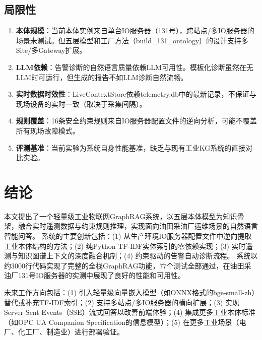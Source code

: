 \documentclass[12pt,a4paper]{article}
\begin{document}
\subsection{局限性}

\begin{enumerate}
  \item \textbf{本体规模}：当前本体实例来自单台IO服务器（131号），跨站点/多IO服务器的场景未测试。但五层模型和工厂方法（build\_131\_ontology）的设计支持多Site/多Gateway扩展。
  \item \textbf{LLM依赖}：告警诊断的自然语言质量依赖LLM可用性。模板化诊断虽然在无LLM时可运行，但生成的报告不如LLM诊断自然流畅。
  \item \textbf{实时数据时效性}：LiveContextStore依赖telemetry.db中的最新记录，不保证与现场设备的实时一致（取决于采集间隔）。
  \item \textbf{规则覆盖}：16条安全约束规则来自IO服务器配置文件的逆向分析，可能不覆盖所有现场故障模式。
  \item \textbf{评测基准}：当前实验为系统自身性能基准，缺乏与现有工业KG系统的直接对比实验。
\end{enumerate}

\section{结论}

本文提出了一个轻量级工业物联网GraphRAG系统，以五层本体模型为知识骨架，融合实时遥测数据与约束规则推理，实现面向油田采油厂运维场景的自然语言智能问答。
系统的主要创新包括：(1) 从生产环境IO服务器配置文件中逆向提取工业本体结构的方法；(2) 纯Python TF-IDF实体索引的零依赖实现；(3) 实时遥测与知识图谱上下文的深度融合机制；(4) 约束驱动的告警自动诊断流程。
系统以约3000行代码实现了完整的全栈GraphRAG功能，77个测试全部通过，在油田采油厂131号IO服务器的实测中展现了良好的性能和可用性。

未来工作方向包括：(1) 引入轻量级向量嵌入模型（如ONNX格式的bge-small-zh）替代或补充TF-IDF索引；(2) 支持多站点/多IO服务器的横向扩展；(3) 实现Server-Sent Events（SSE）流式回答以改善前端体验；(4) 集成更多工业本体标准（如OPC UA Companion Specification的信息模型）；(5) 在更多工业场景（电厂、化工厂、制造业）进行部署验证。
\end{document}
